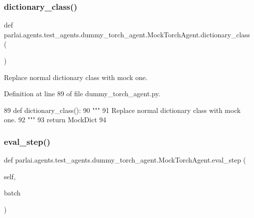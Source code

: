 \subsubsection{\texorpdfstring{dictionary\+\_\+class()}{dictionary\_class()}}
{\footnotesize\ttfamily def parlai.\+agents.\+test\+\_\+agents.\+dummy\+\_\+torch\+\_\+agent.\+Mock\+Torch\+Agent.\+dictionary\+\_\+class (\begin{DoxyParamCaption}{ }\end{DoxyParamCaption})\hspace{0.3cm}{\ttfamily [static]}}

\begin{DoxyVerb}Replace normal dictionary class with mock one.
\end{DoxyVerb}
 

Definition at line 89 of file dummy\+\_\+torch\+\_\+agent.\+py.


\begin{DoxyCode}
89     \textcolor{keyword}{def }dictionary\_class():
90         \textcolor{stringliteral}{"""}
91 \textcolor{stringliteral}{        Replace normal dictionary class with mock one.}
92 \textcolor{stringliteral}{        """}
93         \textcolor{keywordflow}{return} MockDict
94 
\end{DoxyCode}
\mbox{\label{classparlai_1_1agents_1_1test__agents_1_1dummy__torch__agent_1_1MockTorchAgent_aea8dfe6e44a419f31e741c4770a82f9b}} 
\subsubsection{\texorpdfstring{eval\+\_\+step()}{eval\_step()}}
{\footnotesize\ttfamily def parlai.\+agents.\+test\+\_\+agents.\+dummy\+\_\+torch\+\_\+agent.\+Mock\+Torch\+Agent.\+eval\+\_\+step (\begin{DoxyParamCaption}\item[{}]{self,  }\item[{}]{batch }\end{DoxyParamCaption})}

